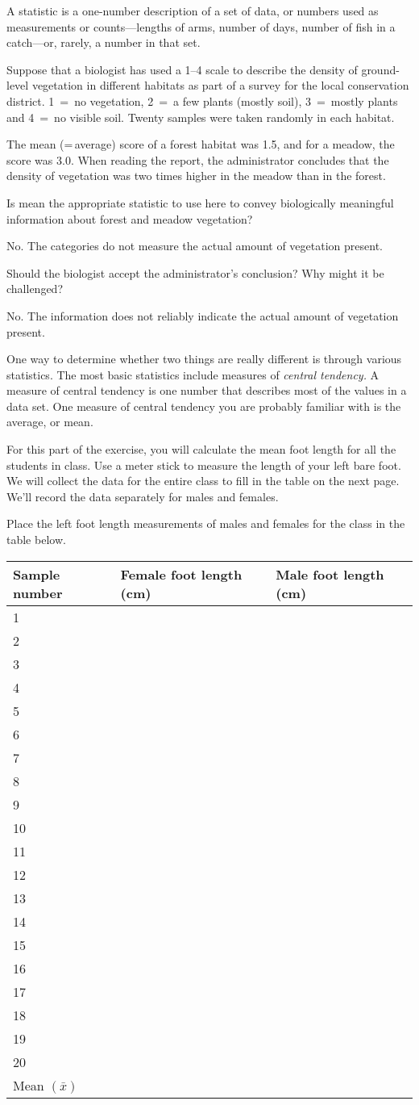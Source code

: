\documentclass[12pt, addpoints, hidelinks]{exam}
\newcommand*\AnswerBox[2]{%
    \parbox[t][#1]{0.92\textwidth}{%
    \begin{solution}#2\end{solution}}
}
\begin{document}
\begin{questions}
A statistic is a one-number description of a set of data, or numbers
used as measurements or counts—lengths of arms, number of days, number
of fish in a catch—or, rarely, a number in that set.

Suppose that a biologist has used a 1–4 scale to describe the density of
ground-level vegetation in different habitats as part of a survey for
the local conservation district. 1~=~no vegetation, 2~=~a few plants
(mostly soil), 3~=~mostly plants and 4~=~no visible soil. Twenty samples
were taken randomly in each habitat.

The mean (=\,average) score of a forest habitat was 1.5, and for a meadow, the score
was 3.0. When reading the report, the administrator concludes that the
density of vegetation was two times higher in the meadow than in the
forest.

\question
 Is mean the appropriate statistic to use here to convey biologically meaningful information about forest and meadow vegetation?
 \AnswerBox{3\baselineskip}{No. The categories do not measure the actual amount of vegetation present.}
 
 \question
Should the biologist accept the administrator's conclusion? Why might it be challenged?
\AnswerBox{3\baselineskip}{No. The information does not reliably indicate the actual amount of vegetation present.}

One way to determine whether two things are really different is through various statistics. The most basic statistics include measures of \emph{central tendency.} A measure of central tendency is one number that describes most of the values in a data set. One measure of central tendency you are probably familiar with is the average, or mean. 

For this part of the exercise, you will calculate the mean foot length for all the students in class. Use a meter stick to measure the length of your left bare foot. We will collect the data for the entire class to fill in the table on the next page. We'll record the data separately for males and females.

\newpage


Place the left foot length measurements of males and females for the
class in the table below.

\begin{longtable}[c]{@{}|l|l|l|@{}}

\hline
Sample number & Female foot length (cm) & Male foot length (cm)\tabularnewline
\hline
1 & & \tabularnewline
\hline
2 & & \tabularnewline
\hline
3 & & \tabularnewline
\hline
4 & & \tabularnewline
\hline
5 & & \tabularnewline
\hline
6 & & \tabularnewline
\hline
7 & & \tabularnewline
\hline
8 & & \tabularnewline
\hline
9 & & \tabularnewline
\hline
10 & & \tabularnewline
\hline
11 & & \tabularnewline
\hline
12 & & \tabularnewline
\hline
13 & & \tabularnewline
\hline
14 & & \tabularnewline
\hline
15 & & \tabularnewline
\hline
16 & & \tabularnewline
\hline
17 & & \tabularnewline
\hline
18 & & \tabularnewline
\hline
19 & & \tabularnewline
\hline
20 & & \tabularnewline
\hline
Mean $(\bar{x})$ & & \tabularnewline
\hline
\end{longtable}


\end{questions}
\end{document}
